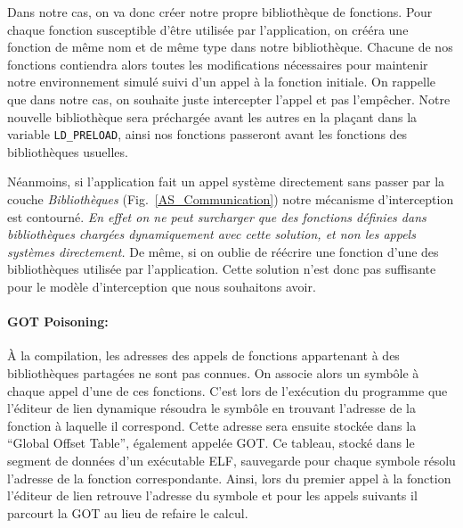 Dans notre cas, on va donc créer notre propre bibliothèque de fonctions. Pour
chaque fonction susceptible d'être utilisée par l'application, on crééra une
fonction de même nom et de même type dans notre bibliothèque. Chacune de nos
fonctions contiendra alors toutes les modifications nécessaires pour maintenir
notre environnement simulé suivi d'un appel à la fonction initiale. On rappelle
que dans notre cas, on souhaite juste intercepter l'appel et pas l'empêcher.
Notre nouvelle bibliothèque sera préchargée avant les autres en la plaçant dans
la variable \texttt{LD\_PRELOAD}, ainsi nos fonctions passeront avant les
fonctions des bibliothèques usuelles.

Néanmoins, si l'application fait un appel système directement sans passer par la
couche \textit{Bibliothèques} (Fig.~\ref{AS_Communication}) notre mécanisme
d'interception est contourné. \textit{En effet on ne peut surcharger que des
  fonctions définies dans bibliothèques chargées dynamiquement avec cette solution, et non les appels
  systèmes directement.} De même, si on oublie de réécrire une fonction d'une
des bibliothèques utilisée par l'application. Cette solution n'est donc pas
suffisante pour le modèle d'interception que nous souhaitons avoir.

\paragraph{GOT Poisoning:}

À la compilation, les adresses des appels de fonctions appartenant à des bibliothèques partagées ne sont pas connues. On associe alors un symbôle à chaque appel d'une de ces fonctions. C'est lors de l'exécution du programme que l'éditeur de lien dynamique résoudra le symbôle en trouvant l'adresse de la fonction à laquelle il correspond. Cette adresse sera ensuite stockée dans la ``Global Offset Table''\citep{ELF}, également appelée GOT. Ce tableau, stocké dans le segment de données d'un exécutable ELF, sauvegarde pour chaque symbole résolu l'adresse de la fonction correspondante. Ainsi, lors du premier appel à la fonction l'éditeur de lien retrouve l'adresse du symbole et pour les appels suivants il parcourt la GOT au lieu de refaire le calcul.

